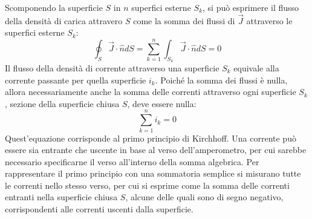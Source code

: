 \documentclass{article}
\numberwithin{equation}{subsection}
\begin{document}
Scomponendo la superficie $S$ in $n$ superfici esterne $S_k$, si può esprimere il flusso della densità di carica attravero $S$ come la somma dei flussi di $\vec{J}$ attraverso 
le superfici esterne $S_k$:
\begin{equation*}
    \displaystyle\oint_{S}\vec{J}\cdot\hat{n}dS=\sum_{k=1}^n\int_{S_k}\vec{J}\cdot\hat{n}dS=0
\end{equation*}
Il flusso della densità di corrente attraverso una superficie $S_k$ equivale alla corrente passante per quella superficie $i_k$. Poiché la somma dei flussi è nulla, allora 
necessariamente anche la somma delle correnti attraverso ogni superficie $S_k$, sezione della superficie chiusa $S$, deve essere nulla:
\begin{equation}
    \displaystyle\sum_{k=1}^ni_k=0
\end{equation}
Quest'equazione corrisponde al primo principio di Kirchhoff. Una corrente può essere sia entrante che uscente in base al verso dell'amperometro, per cui sarebbe necessario 
specificarne il verso all'interno della somma algebrica. Per rappresentare il primo principio con una sommatoria semplice si misurano tutte le correnti nello stesso verso, 
per cui si esprime come la somma delle correnti entranti nella superficie chiusa $S$, alcune delle quali sono di segno negativo, corrispondenti alle correnti uscenti dalla 
superficie. 

\begin{center}
\end{center}
\end{document}
